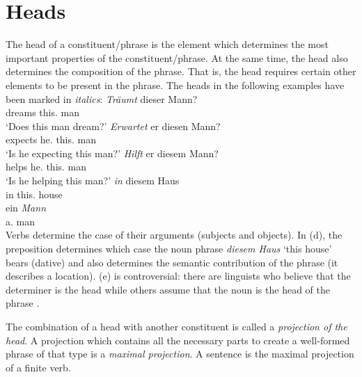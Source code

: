 \section{Heads}
\label{Abschnitt-Kopf}

The head of a constituent/phrase is the element which determines the most important
properties of the constituent/phrase. At the same time, the head also determines the composition of the
phrase. That is, the head requires certain other elements to be present in the phrase. The heads in the following
examples have been marked in \emph{italics}:
\eal
\ex 
\gll \emph{Träumt} dieser Mann?\\
     dreams this.\nom{} man\\
\glt `Does this man dream?'
\ex 
\gll \emph{Erwartet} er diesen Mann?\\
	 expects he.\nom{} this.\acc{} man\\
\glt `Is he expecting this man?'
\ex 
\gll \emph{Hilft} er diesem Mann?\\
	 helps he.\nom{} this.\dat{} man\\
\glt `Is he helping this man?'
\ex 
\gll \emph{in} diesem Haus\\
	 in this.\dat{} house\\
\ex 
\gll ein \emph{Mann}\\
	 a.\nom{} man\\
\zl
Verbs determine the case of their arguments (subjects and objects). In (d), the preposition determines which case the noun phrase \emph{diesem Haus} `this house'
bears (dative) and also determines the semantic contribution of the phrase (it describes a location). (e) is controversial: there are linguists who believe that the
determiner is the head
\parencites[]{Ajdukiewicz35a-u}{VH77a-u,Brame82a}[--92]{Hudson84a-u}{Hellan86a,Abney87a,Netter94,Netter98a}
while others assume that the noun is the head of the phrase \parencites{vanLangendonck94a}[]{ps2}{Demske2001a}[Section~6.6.1]{MuellerLehrbuch1}{Hudson2004a}{Bruening2009a}{MyPM2021a}{MuellerHeadless}.


The combination of a head with another constituent is called a \emph{projection
of the head}. A projection which contains all the necessary parts to create a well-formed phrase of that type
is a \emph{maximal projection}. A sentence is the maximal projection of a finite verb.

